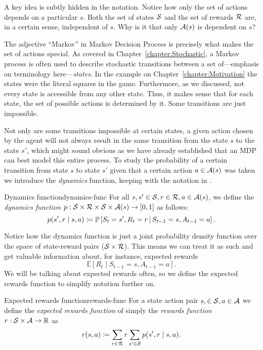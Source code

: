 A key idea is subtly hidden in the notation. Notice how only the set of actions
depends on a particular $s$. Both the set of states $\mathcal{S}$ and the set of
rewards $\mathcal{R}$ are, in a certain sense, independent of $s$. Why is it that
only $\mathcal{A}(s)$ is dependent on $s$?

The adjective ``Markov'' in Markov Decision Process is precisely what makes the
set of actions special. As covered in Chapter~\ref{chapter:Stochastic}, a Markov
process is often used to describe stochastic transitions between a set
of---emphasis on terminology here---\textit{states}. In the example on
Chapter~\ref{chapter:Motivation} the states were the literal squares in the
game. Furthermore, as we discussed, not every state is accessible from any other
state.  Thus, it makes sense that for each state, the set of possible actions is
determined by it. Some transitions are just impossible.

Not only are some transitions impossible at certain states, a given action
chosen by the agent will not always result in the same transition from the state
$s$ to the state $s'$, which might sound obvious as we have already established
that an MDP can best model this entire process. To study the probability
of a certain transition from state $s$ to state $s'$ given that a certain action
$a \in \mathcal{A}(s)$ was taken we introduce the \textit{dynamics} function,
keeping with the notation in \cite{SuttonBarto}.

\begin{dfn}{Dynamics function}{dynamics-func}
	For all $s, s' \in \mathcal{S}, r \in \mathcal{R}, a \in 
	\mathcal{A}(s)$, we define the \emph{dynamics function} $p: 
	\mathcal{S} \times \mathcal{R} \times \mathcal{S} \times \mathcal{A}(s) 
	\to [0, 1]$ as follows:
	\[
		p(s', r \mid s, a) \coloneqq \mathbb{P}\left[S_t = s', R_t = r 
		\,\middle\vert\, S_{t-1} = s, A_{t-1} = a\right].
	\]
\end{dfn}

Notice how the dynamics function is just a joint probability density function
over the space of state-reward pairs ($\mathcal{S} \times \mathcal{R}$). This means we
can treat it as such and get valuable information about, for instance, expected
rewards
\[
	\mathbb{E} \left[ R_t \mid S_{t-1} = s, A_{t-1} = a \right].
\]
We will be talking about expected rewards often, so we define the expected
rewards function to simplify notation further on.

\begin{dfn}{Expected rewards function}{rewards-func}
	For a state action pair $s, \in \mathcal{S}, a \in \mathcal{A}$ we define the
	\emph{expected rewards function} of simply the \emph{rewards function} $r:
	\mathcal{S} \times \mathcal{A} \to \mathbb{R}$ as
	\[
		r(s, a) \coloneqq \sum_{r \in \mathcal{R}} r \sum_{s' \in \mathcal{S}} p(s', r \mid s, a).
	\]
\end{dfn}

